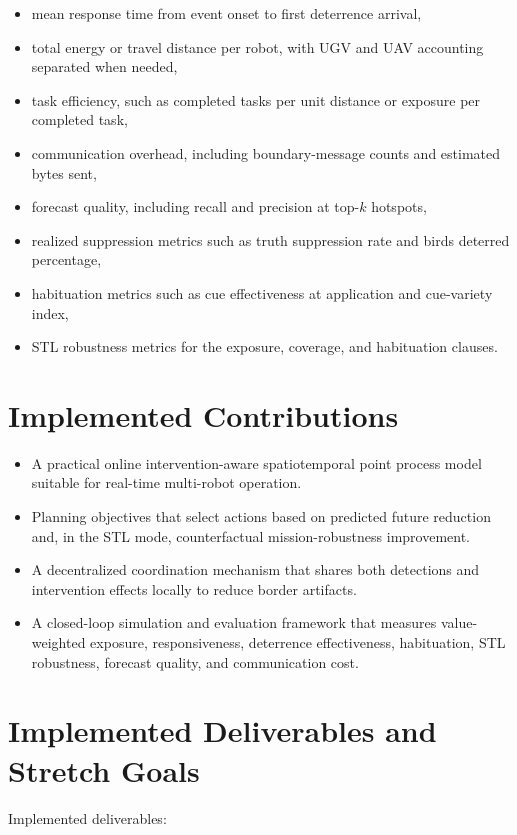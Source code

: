 \begin{itemize}
\item mean response time from event onset to first deterrence arrival,
\item total energy or travel distance per robot, with UGV and UAV accounting separated when needed,
\item task efficiency, such as completed tasks per unit distance or exposure per completed task,
\item communication overhead, including boundary-message counts and estimated bytes sent,
\item forecast quality, including recall and precision at top-$k$ hotspots,
\item realized suppression metrics such as truth suppression rate and birds deterred percentage,
\item habituation metrics such as cue effectiveness at application and cue-variety index,
\item STL robustness metrics for the exposure, coverage, and habituation clauses.
\end{itemize}

\section{Implemented Contributions}

\begin{itemize}
\item A practical online intervention-aware spatiotemporal point process model suitable for real-time multi-robot operation.
\item Planning objectives that select actions based on predicted future reduction and, in the STL mode, counterfactual mission-robustness improvement.
\item A decentralized coordination mechanism that shares both detections and intervention effects locally to reduce border artifacts.
\item A closed-loop simulation and evaluation framework that measures value-weighted exposure, responsiveness, deterrence effectiveness, habituation, STL robustness, forecast quality, and communication cost.
\end{itemize}

\section{Implemented Deliverables and Stretch Goals}

Implemented deliverables:

